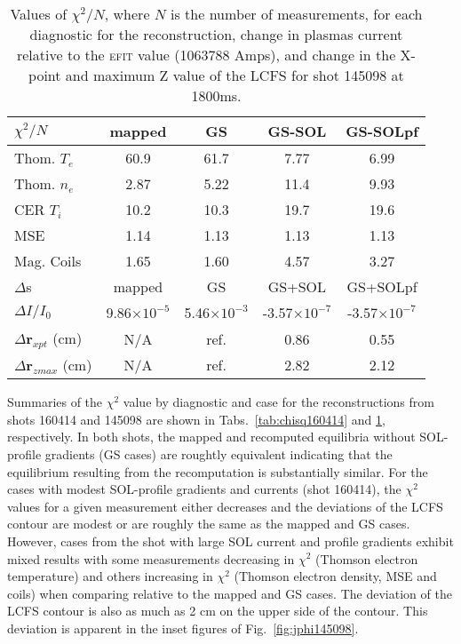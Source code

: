 \documentclass[english,aps,superscriptaddress,showkeys,showpacs,prepri,twocolumn]{revtex4}
\providecommand{\tabularnewline}{\\}
\begin{document}
\begin{table}
\caption{
Values of $\chi^2 /N$, where $N$ is the number of measurements, for each
diagnostic for the reconstruction, change in plasmas current relative to the
\textsc{efit} value (1063788 Amps), and change in the X-point and maximum Z value of the
LCFS for shot 145098 at 1800ms.
\label{tab:chisq145098}}
\centering{}%
\begin{tabular}{lcccc}
\hline
$\chi^2 /N$ & mapped & GS & GS-SOL & GS-SOLpf \tabularnewline
\hline
Thom. $T_e$ & 60.9 & 61.7 & 7.77 & 6.99 \tabularnewline
Thom. $n_e$ & 2.87 & 5.22 & 11.4 & 9.93 \tabularnewline
CER $T_i$   & 10.2 & 10.3 & 19.7 & 19.6 \tabularnewline
MSE         & 1.14 & 1.13 & 1.13 & 1.13 \tabularnewline
Mag. Coils  & 1.65 & 1.60 & 4.57 & 3.27 \tabularnewline
\hline
$\Delta$s   & mapped & GS & GS+SOL & GS+SOLpf \tabularnewline
\hline
$\Delta I/I_0$ & 9.86$\times 10^{-5}$ & 5.46$\times 10^{-3}$ & -3.57$\times 10^{-7}$ & -3.57$\times 10^{-7}$ \tabularnewline
$\Delta \mathbf{r}_{xpt}$ (cm)  & N/A & ref. & 0.86 & 0.55 \tabularnewline
$\Delta \mathbf{r}_{zmax}$ (cm) & N/A & ref. & 2.82 & 2.12 \tabularnewline
\hline
\end{tabular}
\end{table}

Summaries of the $\chi^2$ value by diagnostic and case for the reconstructions from
shots 160414 and 145098 are shown in Tabs.~\ref{tab:chisq160414} and
\ref{tab:chisq145098}, respectively.  In both shots, the mapped and recomputed
equilibria without SOL-profile gradients (GS cases) are roughtly equivalent
indicating that the equilibrium resulting from the recomputation is
substantially similar.  For the cases with modest SOL-profile gradients 
and currents (shot 160414), the $\chi^2$ values for a given
measurement either decreases and the deviations of the LCFS contour are modest
or are roughly the same as the mapped and GS cases.  However, cases from the
shot with large SOL current and profile gradients exhibit mixed results
with some measurements decreasing in $\chi^2$ (Thomson electron temperature) 
and others increasing in $\chi^2$ (Thomson electron density,  MSE and coils) 
when comparing
relative to the mapped and GS cases. The deviation of the LCFS contour is
also as much as 2 cm on the upper side of the contour. This deviation
is apparent in the inset figures of Fig.~\ref{fig:jphi145098}.
\end{document}
